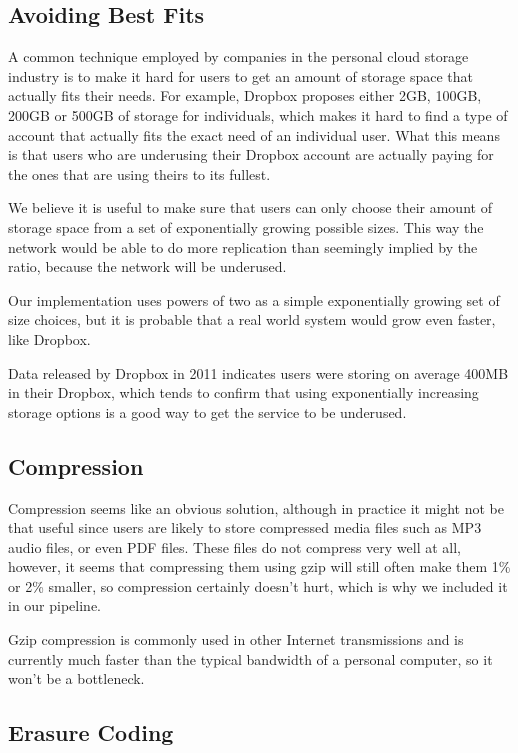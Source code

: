 \documentclass[11pt]{IEEEtran}
\begin{document}
\subsection{Avoiding Best Fits}

A common technique employed by companies in the personal cloud storage industry is to make it hard for users to get an amount of storage space that actually fits their needs. For example, Dropbox proposes either 2GB, 100GB, 200GB or 500GB of storage for individuals\cite{dropbox}, which makes it hard to find a type of account that actually fits the exact need of an individual user. What this means is that users who are underusing their Dropbox account are actually paying for the ones that are using theirs to its fullest.

We believe it is useful to make sure that users can only choose their amount of storage space from a set of exponentially growing possible sizes. This way the network would be able to do more replication than seemingly implied by the ratio, because the network will be underused.

Our implementation uses powers of two as a simple exponentially growing set of size choices, but it is probable that a real world system would grow even faster, like Dropbox.

Data released by Dropbox in 2011 indicates users were storing on average 400MB in their Dropbox\cite{dropbox_slides}, which tends to confirm that using exponentially increasing storage options is a good way to get the service to be underused.

\subsection{Compression}

Compression seems like an obvious solution, although in practice it might not be that useful since users are likely to store compressed media files such as MP3 audio files, or even PDF files. These files do not compress very well at all, however, it seems that compressing them using gzip will still often make them 1\% or 2\% smaller\cite{compression_comparison}, so compression certainly doesn't hurt, which is why we included it in our pipeline.

Gzip compression is commonly used in other Internet transmissions and is currently much faster than the typical bandwidth of a personal computer, so it won't be a bottleneck.

\subsection{Erasure Coding}
\end{document}
